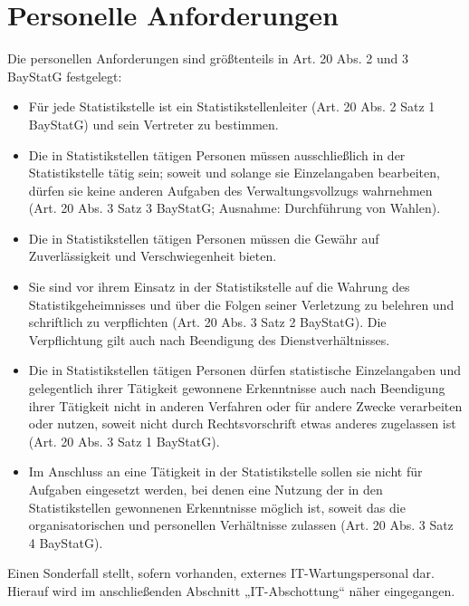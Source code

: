 \section{Personelle Anforderungen}
Die personellen Anforderungen sind größtenteils in Art. 20 Abs. 2 und 3 BayStatG festgelegt:
\begin{itemize}
    \item Für jede Statistikstelle ist ein Statistikstellenleiter (Art. 20 Abs. 2 Satz 1 BayStatG) und sein Vertreter zu bestimmen.
    \item Die in Statistikstellen tätigen Personen müssen ausschließlich in der Statistikstelle tätig sein; soweit und solange sie Einzelangaben bearbeiten, dürfen sie keine anderen Aufgaben des Verwaltungsvollzugs wahrnehmen (Art. 20 Abs. 3 Satz 3 BayStatG; Ausnahme: Durchführung von Wahlen).
    \item Die in Statistikstellen tätigen Personen müssen die Gewähr auf Zuverlässigkeit und Verschwiegenheit bieten.
    \item Sie sind vor ihrem Einsatz in der Statistikstelle auf die Wahrung des Statistikgeheimnisses und über die Folgen seiner Verletzung zu belehren und schriftlich zu verpflichten (Art. 20 Abs. 3 Satz 2 BayStatG). Die Verpflichtung gilt auch nach Beendigung des Dienstverhältnisses.
    \item Die in Statistikstellen tätigen Personen dürfen statistische Einzelangaben und gelegentlich ihrer Tätigkeit gewonnene Erkenntnisse auch nach Beendigung ihrer Tätigkeit nicht in anderen Verfahren oder für andere Zwecke verarbeiten oder nutzen, soweit nicht durch Rechtsvorschrift etwas anderes zugelassen ist (Art. 20 Abs. 3 Satz 1 BayStatG).
    \item Im Anschluss an eine Tätigkeit in der Statistikstelle sollen sie nicht für Aufgaben eingesetzt werden, bei denen eine Nutzung der in den Statistikstellen gewonnenen Erkenntnisse möglich ist, soweit das die organisatorischen und personellen Verhältnisse zulassen (Art. 20 Abs. 3 Satz 4 BayStatG).
\end{itemize}
Einen Sonderfall stellt, sofern vorhanden, externes IT-Wartungspersonal dar. Hierauf wird im anschließenden Abschnitt „IT-Abschottung“ näher eingegangen.
